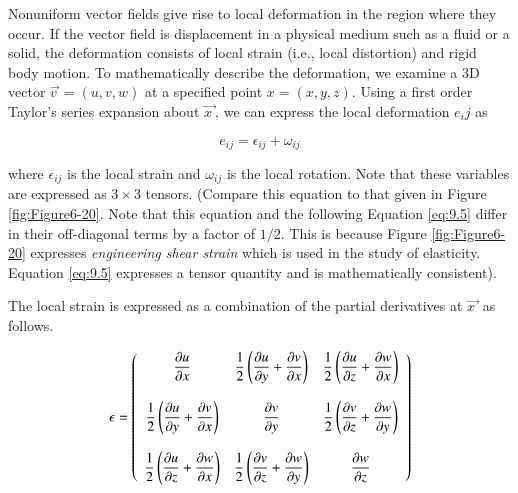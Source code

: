 Nonuniform vector fields give rise to local deformation in the region where they occur. If the vector field is displacement in a physical medium such as a fluid or a solid, the deformation consists of local strain (i.e., local distortion) and rigid body motion. To mathematically describe the deformation, we examine a 3D vector $\overrightarrow{v\ } = (u, v, w)$ at a specified point $x = (x, y, z)$. Using a first order Taylor's series expansion about $\overrightarrow{x\ }$, we can express the local deformation $e_ij$ as

\begin{equation}\label{eq:9.4}
e_{ij} = \epsilon_{ij} + \omega_{ij}
\end{equation}

where $\epsilon_{ij}$ is the local strain and $\omega_{ij}$ is the local rotation. Note that these variables are expressed as $3 \times 3$ tensors. (Compare this equation to that given in Figure \ref{fig:Figure6-20}. Note that this equation and the following Equation \ref{eq:9.5} differ in their off-diagonal terms by a factor of $1/2$. This is because Figure \ref{fig:Figure6-20} expresses \emph{engineering shear strain} which is used in the study of elasticity. Equation \ref{eq:9.5} expresses a tensor quantity and is mathematically consistent).

The local strain is expressed as a combination of the partial derivatives at $\overrightarrow{x\ }$ as follows.

\begin{equation}\label{eq:9.5}
\mathbf{\epsilon} = \left(
\begin{array}{c c c}
  \dfrac{\partial u}{\partial x} &
  \dfrac{1}{2}\left(\dfrac{\partial u}{\partial y} + \dfrac{\partial v}{\partial x}\right) &
  \dfrac{1}{2}\left(\dfrac{\partial u}{\partial z} + \dfrac{\partial w}{\partial x}\right) \\ \\
  \dfrac{1}{2}\left(\dfrac{\partial u}{\partial y} + \dfrac{\partial v}{\partial x}\right) &
  \dfrac{\partial v}{\partial y} &
  \dfrac{1}{2}\left(\dfrac{\partial v}{\partial z} + \dfrac{\partial w}{\partial y}\right) \\ \\
  \dfrac{1}{2}\left(\dfrac{\partial u}{\partial z} + \dfrac{\partial w}{\partial x}\right) &
  \dfrac{1}{2}\left(\dfrac{\partial v}{\partial z} + \dfrac{\partial w}{\partial y}\right) &
  \dfrac{\partial w}{\partial z}
\end{array}\right)
\end{equation}

